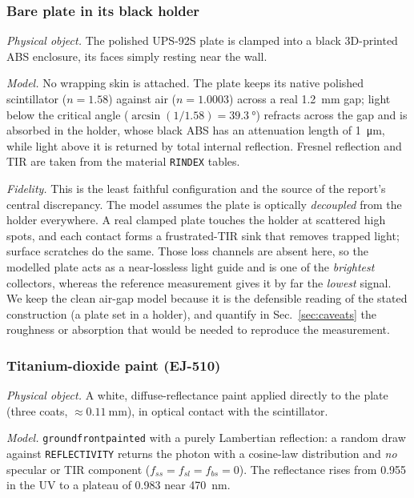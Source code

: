 \documentclass[11pt,a4paper]{article}
\begin{document}
\subsubsection{Bare plate in its black holder}
\label{sec:refl-bare}

\emph{Physical object.} The polished UPS-92S plate is clamped into a black
3D-printed ABS enclosure, its faces simply resting near the wall.

\emph{Model.} No wrapping skin is attached. The plate keeps its native polished
scintillator ($n=1.58$) against air ($n=1.0003$) across a real
\SI{1.2}{\milli\meter} gap; light below the critical angle
($\arcsin(1/1.58)=\SI{39.3}{\degree}$) refracts across the gap and is absorbed in
the holder, whose black ABS has an attenuation length of
\SI{1}{\micro\meter}, while light above it is returned by total internal
reflection. Fresnel reflection and TIR are taken from the material
\texttt{RINDEX} tables.

\emph{Fidelity.} This is the least faithful configuration and the source of the
report's central discrepancy. The model assumes the plate is optically
\emph{decoupled} from the holder everywhere. A real clamped plate touches the
holder at scattered high spots, and each contact forms a frustrated-TIR sink
that removes trapped light; surface scratches do the same. Those loss channels
are absent here, so the modelled plate acts as a near-lossless light guide and
is one of the \emph{brightest} collectors, whereas the reference measurement
gives it by far the \emph{lowest} signal. We keep the clean air-gap model
because it is the defensible reading of the stated construction (a plate set in
a holder), and quantify in Sec.~\ref{sec:caveats} the roughness or absorption
that would be needed to reproduce the measurement.

\subsubsection{Titanium-dioxide paint (EJ-510)}
\label{sec:refl-tio2}

\emph{Physical object.} A white, diffuse-reflectance paint applied directly to
the plate (three coats, $\approx\SI{0.11}{\milli\meter}$), in optical contact
with the scintillator.

\emph{Model.} \texttt{groundfrontpainted} with a purely Lambertian reflection: a
random draw against \texttt{REFLECTIVITY} returns the photon with a cosine-law
distribution and \emph{no} specular or TIR component
($f_{ss}=f_{sl}=f_{bs}=0$). The reflectance rises from \num{0.955} in the UV to
a plateau of \num{0.983} near \SI{470}{\nano\meter}.
\end{document}
